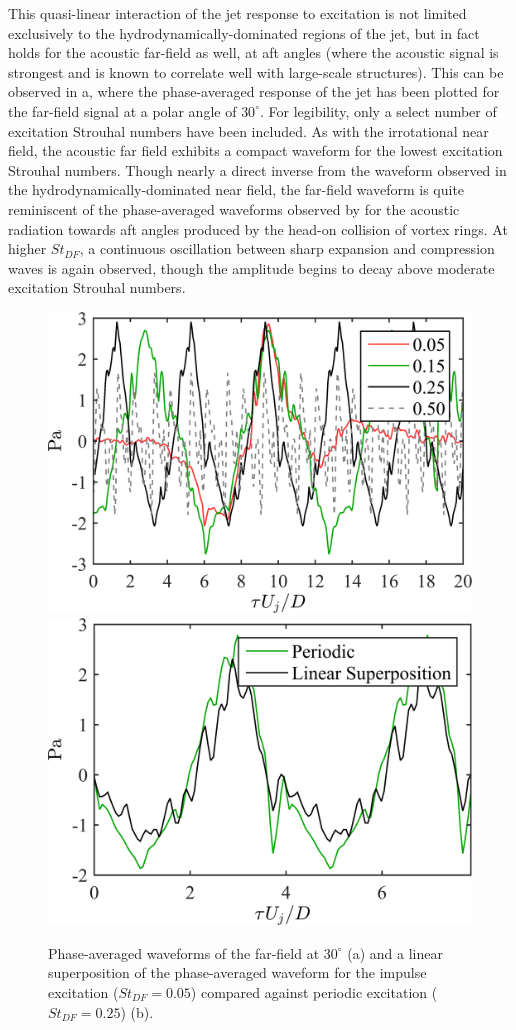 This quasi-linear interaction of the jet response to excitation is not limited exclusively to the hydrodynamically-dominated regions of the jet, but in fact holds for the acoustic far-field as well, at aft angles (where the acoustic signal is strongest and is known to correlate well with large-scale structures). 
This can be observed in a, where the phase-averaged response of the jet has been plotted for the far-field signal at a polar angle of $30^\circ$. 
For legibility, only a select number of excitation Strouhal numbers have been included. 
As with the irrotational near field, the acoustic far field exhibits a compact waveform for the lowest excitation Strouhal numbers. 
Though nearly a direct inverse from the waveform observed in the hydrodynamically-dominated near field, the far-field waveform is quite reminiscent of the phase-averaged waveforms observed by \citet{Kambe1983} for the acoustic radiation towards aft angles produced by the head-on collision of vortex rings. 
At higher $St_{DF}$, a continuous oscillation between sharp expansion and compression waves is again observed, though the amplitude begins to decay above moderate excitation Strouhal numbers. 
\begin{figure}
	\centering
		\includegraphics[width=0.45\linewidth]{Figures/ch3_farfield_phavg_v2.png}
		\includegraphics[width=0.45\linewidth]{Figures/ch3_farfield_linear_v2.png}
	\caption{Phase-averaged waveforms of the far-field at $30^\circ$ (a) and a linear superposition of the phase-averaged waveform for the impulse excitation ($St_{DF} = 0.05$) compared against periodic excitation ($St_{DF} = 0.25$) (b).}
	\label{fig:ch3_farfield}
\end{figure}

